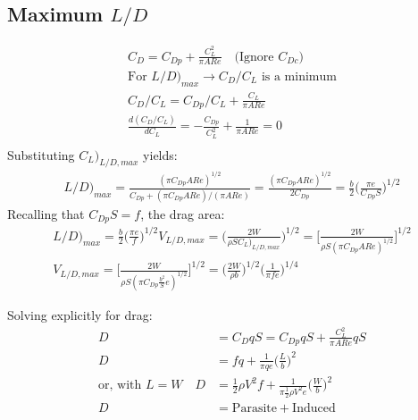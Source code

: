 \documentclass[draft=false, titlepage]{article}
\begin{document}
\subsection{Maximum $L/D$}
\begin{gather*}
C_D = C_{Dp} + \frac{C_L^2}{\pi AR e} \quad \text{(Ignore } C_{Dc})\\
\text{For } L/D\big)_{max} \rightarrow C_D/C_L \text{ is a minimum}\\
C_D/C_L = C_{Dp}/C_L + \frac{C_L}{\pi AR e}\\
\frac{d(C_D/C_L)}{dC_L} = -\frac{C_{Dp}}{C_L^2} + \frac{1}{\pi AR e} = 0\\
\end{gather*}
Substituting $C_L\big)_{L/D,max}$ yields:
\begin{gather*}
L/D\big)_{max} = \frac{(\pi C_{Dp} AR e)^{1/2}}{C_{Dp} + (\pi C_{Dp} AR e)/(\pi AR e)} =
\frac{(\pi C_{Dp} AR e)^{1/2}}{2C_{Dp}} = \frac{b}{2}\Big(\frac{\pi e}{C_{Dp}S}\Big)^{1/2}
\end{gather*}
Recalling that $C_{Dp} S = f$, the drag area:
\begin{gather*}
L/D\big)_{max} = \frac{b}{2} \Big(\frac{\pi e}{f}\Big)^{1/2}
V_{L/D,max} = \Big( \frac{2W}{\rho S C_L\big)_{L/D,max}} \Big)^{1/2} = \Big[ \frac{2W}{\rho S(\pi C_{Dp} AR e)^{1/2}} \Big]^{1/2}\\
	V_{L/D,max} = \Big[ \frac{2W}{\rho S (\pi C_{Dp} \frac{b^2}{S} e)^{1/2}} \Big]^{1/2} = \Big(\frac{2W}{\rho b}\Big)^{1/2} \Big(\frac{1}{\pi fe}\Big)^{1/4}
\end{gather*}

Solving explicitly for drag:
\begin{align*}
D &= C_D qS = C_{Dp} qS + \frac{C_L^2}{\pi AR e} qS\\
D &= fq + \frac{1}{\pi qe} \Big(\frac{L}{b}\Big)^2\\
\text{or, with } L=W \quad D &= \frac{1}{2} \rho V^2 f + \frac{1}{\pi \frac{1}{2}\rho V^2 e} \Big(\frac{W}{b}\Big)^2\\
D &= \text{Parasite} + \text{Induced}
\end{align*}
\end{document}
